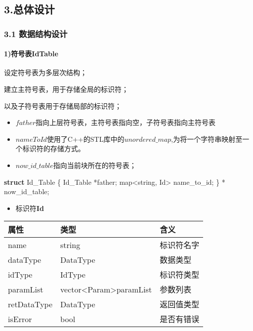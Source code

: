 \documentclass[]{ctexart}
\newenvironment{Shaded}{}{}
\newcommand{\KeywordTok}[1]{\textcolor[rgb]{0.00,0.44,0.13}{\textbf{#1}}}
\newcommand{\NormalTok}[1]{#1}
\let\oldparagraph\paragraph
\renewcommand{\paragraph}[1]{\oldparagraph{#1}\mbox{}}
\begin{document}
\hypertarget{header-n11}{%
\subsection{3.总体设计}\label{header-n11}}

\hypertarget{header-n12}{%
\subsubsection{3.1 数据结构设计}\label{header-n12}}

\hypertarget{header-n14}{%
\paragraph{1)符号表IdTable}\label{header-n14}}

设定符号表为多层次结构；

建立主符号表，用于存储全局的标识符；

以及子符号表用于存储局部的标识符；

\begin{itemize}
\item
  \(father\)指向上层符号表，主符号表指向空，子符号表指向主符号表
\item
  \(nameToId\)使用了C++的STL库中的\(unordered\_map\),为将一个字符串映射至一个标识符的存储方式。
\item
  \(now\_id\_table\)指向当前块所在的符号表；
\end{itemize}

\begin{Shaded}
\begin{Highlighting}[]
\KeywordTok{struct}\NormalTok{ Id_Table}
\NormalTok{\{}
\NormalTok{	Id_Table *father;		}
\NormalTok{	map<string, Id> name_to_id;}
\NormalTok{\} * now_id_table;}
\end{Highlighting}
\end{Shaded}

\begin{itemize}
\item
  标识符\textbf{Id}
\end{itemize}

\begin{longtable}[]{@{}lll@{}}
\toprule
属性 & 类型 & 含义\tabularnewline
\midrule
\endhead
name & string & 标识符名字\tabularnewline
dataType & DataType & 数据类型\tabularnewline
idType & IdType & 标识符类型\tabularnewline
paramList & vector\textless{}Param\textgreater{}paramList &
参数列表\tabularnewline
retDataType & DataType & 返回值类型\tabularnewline
isError & bool & 是否有错误\tabularnewline
\bottomrule
\end{longtable}
\end{document}
